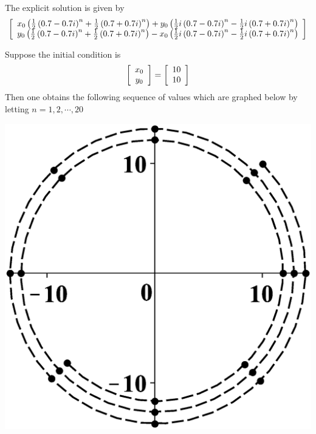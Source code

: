 \begin{solution}
The explicit solution is given by
\begin{equation*}
\leftB
\begin{array}{c}
x_{0}\left( \vspace{0.05in}\frac{1}{2}\left( 0.7-0.7i \right) ^{n}+\vspace{0.05in}\frac{1}{2}
\left( 0.7+0.7i\right) ^{n}\right) + \allowbreak y_{0}\left( \vspace{0.05in}\frac{1}{2}
i\left( 0.7-0.7i\right) ^{n}-\frac{1}{2}i \left(
0.7+0.7i\right)  ^{n}\right) \\
y_{0}\left( \vspace{0.05in}\frac{1}{2} \left( 0.7-0.7i \right) ^{n}+\vspace{0.05in}\frac{1}{2}
\left( 0.7+0.7i\right) ^{n}\right) -  x_{0}\left( \vspace{0.05in}\frac{1}{2}
i\left( 0.7-0.7i\right) ^{n}-\vspace{0.05in}\frac{1}{2}i\left( 
0.7+0.7i\right) ^{n}\right)
\end{array}
\rightB
\end{equation*}

Suppose the initial condition is
\begin{equation*}
\left[
\begin{array}{c}
x_{0} \\
y_{0}
\end{array}
\right] =\left[
\begin{array}{r}
10 \\
10
\end{array}
\right]
\end{equation*}
Then one obtains the following sequence of values which are graphed below by
letting $n=1,2,\cdots ,20$

\begin{center}
\includegraphics[bb=0 0 800 800,scale=.2]{figures/4dec.eps}
\end{center}


\end{solution}
